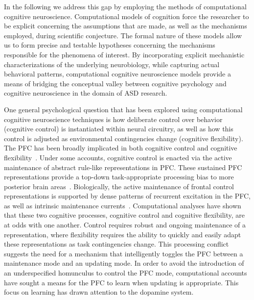\documentclass[man]{apa}
\begin{document}
In the following we address this gap by employing the methods of computational cognitive neuroscience.  Computational models of cognition force the researcher to be explicit concerning the assumptions that are made, as well as the mechanisms employed, during scientific conjecture. The formal nature of these models allow us to form precise and testable hypotheses concerning the mechanisms responsible for the phenomena of interest. By incorporating explicit mechanistic characterizations of the underlying neurobiology, while capturing actual behavioral patterns, computational cognitive neuroscience models provide a means of bridging the conceptual valley between cognitive psychology and cognitive neuroscience in the domain of ASD research.

One general psychological question that has been explored using computational cognitive neuroscience techniques is how deliberate control over behavior (cognitive control) is instantiated within neural circuitry, as well as how this control is adjusted as environmental contingencies change (cognitive flexibility).  The PFC has been broadly implicated in both cognitive control and cognitive flexibility~\cite{Stuss:2000:WCSTLesion,Stuss:2001:StroopLesion}. Under some accounts, cognitive control is enacted via the active maintenance of abstract rule-like representations in PFC.  These sustained PFC representations provide a top-down task-appropriate processing bias to more posterior brain areas~\cite{CohenJD:1990:Stroop}. Biologically, the active maintenance of frontal control representations is supported by dense patterns of recurrent excitation in the PFC, as well as intrinsic maintenance currents~\cite{Goldman-RakicPS:1987:PFC_Maintenance}.  Computational analyses have shown that these two cognitive processes, cognitive control and cognitive flexibility, are at odds with one another.  Control requires robust and ongoing maintenance of a representation, where flexibility requires the ability to quickly and easily adapt these representations as task contingencies change.  This processing conflict suggests the need for a mechanism that intelligently toggles the PFC between a maintenance mode and an updating mode.  In order to avoid the introduction of an underspecified homunculus to control the PFC mode, computational accounts have sought a means for the PFC to learn when updating is appropriate.  This focus on learning has drawn attention to the dopamine system.   
\end{document}
